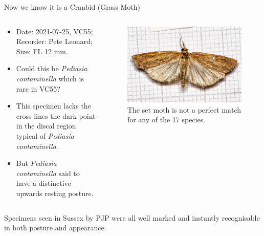 \documentclass[
  ignorenonframetext,
]{beamer}
\providecommand{\tightlist}{%
  \setlength{\itemsep}{0pt}\setlength{\parskip}{0pt}}
\begin{document}
\begin{frame}{Now we know it is a Cranbid (Grass Moth)}
\protect\hypertarget{now-we-know-it-is-a-cranbid-grass-moth}{}
\begin{columns}[T]
\begin{column}{0.5\textwidth}
\begin{itemize}
\tightlist
\item
  Date: 2021-07-25, VC55; Recorder: Pete Leonard; Size: FL 12 mm.
\item
  Could this be \emph{Pediasia contaminella} which is rare in VC55?
\item
  This specimen lacks the cross lines the dark point in the discal
  region typical of \emph{Pediasia contaminella}.
\item
  But \emph{Pediasia contaminella} said to have a distinctive upwards
  resting posture.
\end{itemize}
\end{column}

\begin{column}{0.5\textwidth}
\begin{figure}
\centering
\includegraphics{./images/PJP20220218-0001a.jpg}
\caption{The set moth is not a perfect match for any of the 17 species.}
\end{figure}
\end{column}
\end{columns}

Specimens seen in Sussex by PJP were all well marked and instantly
recognisable in both posture and appearance.
\end{frame}
\end{document}
